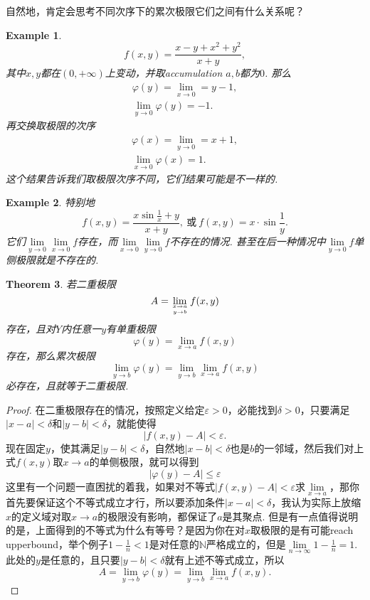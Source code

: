 \documentclass{article}
\newtheorem{theorem}{Theorem}[section]
\newtheorem{example}[theorem]{Example}
\begin{document}
{\color{blue} 自然地，肯定会思考不同次序下的累次极限它们之间有什么关系呢}？

\begin{example}
\rm $$
	f(x,y) = \frac{x-y + x^2 + y^2}{x + y},
$$
其中$x,y$都在$(0,+\infty)$上变动，并取accumulation $a,b$都为$0$. 那么
$$
\begin{array}{l}
\varphi(y) = \lim\limits_{x \rightarrow 0} = y -1, \\
\lim\limits_{y \rightarrow 0} \varphi(y) = -1.
\end{array}
$$
再交换取极限的次序
$$
\begin{array}{l}
\varphi(x) = \lim\limits_{y \rightarrow 0} = x+1, \\
\lim\limits_{x \rightarrow 0} \varphi(x) = 1.
\end{array}
$$
{\color{red} 这个结果告诉我们取极限次序不同，它们结果可能是不一样的}.
\end{example}

\begin{example}
\rm 特别地
$$
f(x,y) = \frac{x\sin\frac{1}{x} + {y}}{x+y},~\text{或}~f(x,y)= x \cdot \sin\frac{1}{y}.
$$
它们$\lim\limits_{y \rightarrow 0}\lim\limits_{x \rightarrow 0}f$存在，而$\lim\limits_{x \rightarrow 0}\lim\limits_{y \rightarrow 0}f$不存在的情况. 甚至在后一种情况中$\lim\limits_{y \rightarrow 0}f$单侧极限就是不存在的.
\end{example}

\begin{theorem}
\rm 若二重极限
$$
A = \lim\limits_{x \rightarrow a \atop y \rightarrow b}f(x,y)
$$
存在，且对$Y$内任意一$y$有单重极限
$$
\varphi(y) = \lim\limits_{x \rightarrow a}f(x,y)
$$
存在，那么累次极限
$$
\lim\limits_{y \rightarrow b}\varphi(y) = \lim\limits_{y \rightarrow b}\lim\limits_{x \rightarrow a}f(x,y)
$$
必存在，且就等于二重极限.
\end{theorem}

\begin{proof}
在二重极限存在的情况，按照定义给定$\varepsilon >0$，必能找到$\delta > 0$，只要满足$|x - a| < \delta$和$|y-b| < \delta$，就能使得
$$
|f(x,y) - A| < \varepsilon.
$$
现在固定$y$，使其满足$|y-b| < \delta$，自然地$|x-b| < \delta$也是$b$的一邻域，然后我们对上式$f(x,y)$取$x \rightarrow a$的单侧极限，就可以得到
$$
|\varphi(y)-A| \leq \varepsilon
$$
这里有一个问题一直困扰的着我，如果对不等式$|f(x,y)-A| < \varepsilon$求$\lim\limits_{x \rightarrow a}$，那你首先要保证这个不等式成立才行，所以要添加条件$|x -a | < \delta$，我认为实际上放缩$x$的定义域对取$x \rightarrow a$的极限没有影响，都保证了$a$是其聚点. 但是有一点值得说明的是，上面得到的不等式为什么有等号？是因为你在对$x$取极限的是有可能reach upperbound，举个例子$1-\frac{1}{n} < 1$是对任意的$\mathbb{N}$严格成立的，但是$\lim\limits_{n \rightarrow \infty} 1-\frac{1}{n} = 1$. 此处的$y$是任意的，且只要$|y-b| < \delta$就有上述不等式成立，所以
$$
A = \lim\limits_{y \rightarrow b}\varphi(y) = \lim\limits_{y \rightarrow b}\lim\limits_{x \rightarrow a}f(x,y).
$$
\end{proof}
\end{document}
